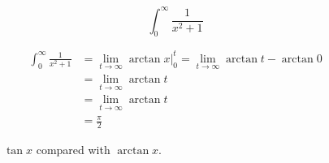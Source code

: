 \begin{ex}
	\[ \int^\infty_0 \frac{1}{x^2+1} \]
	\begin{sol}
	\begin{align*}
		\int^\infty_0 \frac{1}{x^2+1} &= \lim_{t \to \infty} \arctan x \bigg|^t_0 = \lim_{t \to \infty} \arctan t - \arctan 0 \\
		&= \lim_{t \to \infty} \arctan t \\
		&= \lim_{t \to \infty} \arctan t \\
		&= \frac{\pi}{2}
	\end{align*}
  \begin{figure}[H]
    \begin{center}
    \end{center}
    \caption{\(\tan x\) compared with \(\arctan x\).}
  \end{figure}
  \end{sol}
\end{ex}
